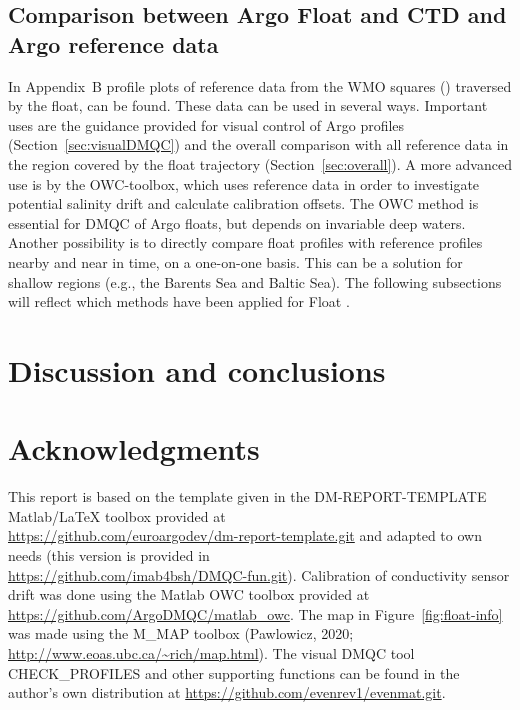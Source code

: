 \documentclass{article}
\begin{document}
\subsection{Comparison between Argo Float and CTD and Argo reference data}\label{sec:salcompare}
%
In Appendix~B profile plots of reference data from the WMO squares
() traversed by the float, can be found. These data can
be used in several ways.
%
Important uses are the guidance provided for visual control of Argo
profiles (Section~\ref{sec:visualDMQC}) and the overall comparison with
all reference data in the region covered by the float trajectory
(Section~\ref{sec:overall}).
%
A more advanced use is by the OWC-toolbox, which uses reference data in
order to investigate potential salinity drift and calculate calibration
offsets. The OWC method is essential for DMQC of Argo floats, but depends
on invariable deep waters.
% 
Another possibility is to directly compare float profiles with reference
profiles nearby and near in time, on a one-on-one basis. This can be a
solution for shallow regions (e.g., the Barents Sea and Baltic Sea).
%
The following subsections will reflect which methods have been applied for
Float \WMOnum.







\FloatBarrier
\newpage
\section{Discussion and conclusions}\label{sec:discussion}






\section*{Acknowledgments}
This report is based on the template given in the DM-REPORT-TEMPLATE
Matlab/LaTeX toolbox provided at\\
\href{url}{https://github.com/euroargodev/dm-report-template.git} and
adapted to own needs (this version is provided in\\
\href{url}{https://github.com/imab4bsh/DMQC-fun.git}).  
%
Calibration of conductivity sensor drift was done using the Matlab OWC
toolbox provided at \href{url}{https://github.com/ArgoDMQC/matlab\_owc}.
%
The map in Figure~\ref{fig:float-info} was made using the M\_MAP toolbox
(Pawlowicz, 2020; \url{http://www.eoas.ubc.ca/~rich/map.html}).
%
The visual DMQC tool CHECK\_PROFILES and other supporting functions can be
found in the author's own distribution at
\href{url}{https://github.com/evenrev1/evenmat.git}.
\end{document}

